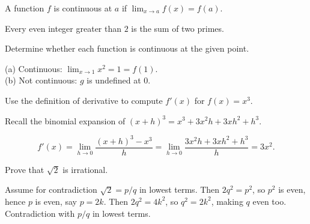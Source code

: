 \documentclass[
	pset-number = 3,
	pset-due    = {Friday, May 15, 2026},
]{pset}
\begin{document}
\maketitle

\begin{definition}[Continuity]
	A function $f$ is continuous at $a$ if
	$\lim_{x \to a} f(x) = f(a)$.
\end{definition}

\begin{conjecture}[Goldbach]
	Every even integer greater than $2$ is the sum of two primes.
\end{conjecture}

\begin{problem}[10]
	Determine whether each function is continuous at the given point.
\end{problem}

\begin{solution}[3in]
	(a) Continuous: $\lim_{x \to 1} x^2 = 1 = f(1)$.\\
	(b) Not continuous: $g$ is undefined at $0$.
\end{solution}

\begin{problem}[15]
	Use the definition of derivative to compute $f'(x)$ for $f(x) = x^3$.
\end{problem}

\hint Recall the binomial expansion of $(x+h)^3 = x^3 + 3x^2 h + 3xh^2 + h^3$.

\begin{solution}[4in]
	\[
		f'(x)
		= \lim_{h \to 0} \frac{(x+h)^3 - x^3}{h}
		= \lim_{h \to 0} \frac{3x^2 h + 3xh^2 + h^3}{h}
		= 3x^2.
	\]
\end{solution}

\begin{problem}[20]
	Prove that $\sqrt{2}$ is irrational.
\end{problem}

\begin{solution}[5in]
	Assume for contradiction $\sqrt{2} = p/q$ in lowest terms.
	Then $2q^2 = p^2$, so $p^2$ is even, hence $p$ is even, say $p = 2k$.
	Then $2q^2 = 4k^2$, so $q^2 = 2k^2$, making $q$ even too.
	Contradiction with $p/q$ in lowest terms.
\end{solution}
\end{document}
